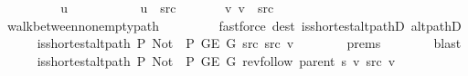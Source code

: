 \begin{isabellebody}
\ \ \isamarkupfalse%
\isanewline
\ \ \ \ \isamarkupfalse%
\ {\isacharparenleft}{\kern0pt}{}\ u{\isacharparenright}{\kern0pt}\isanewline
\ \ \ \ \isamarkupfalse%
\isanewline
\ \ \ \ \ \ {\isachardoublequoteopen}u\ {\isacharequal}{\kern0pt}\ src{\isachardoublequoteclose}\ \isanewline
\ \ \ \ \ \ v{\isacharcolon}{\kern0pt}\ {\isachardoublequoteopen}v\ {\isacharequal}{\kern0pt}\ src{\isachardoublequoteclose}\isanewline
\ \ \ \ \ \ \isamarkupfalse%
\ walk{\isacharunderscore}{\kern0pt}between{\isacharunderscore}{\kern0pt}nonempty{\isacharunderscore}{\kern0pt}path{\isacharparenleft}{\kern0pt}{}{\isacharcomma}{\kern0pt}\ {}{\isacharparenright}{\kern0pt}\isanewline
\ \ \ \ \ \ \isamarkupfalse%
\ {\isacharparenleft}{\kern0pt}fastforce\ dest{\isacharcolon}{\kern0pt}\ is{\isacharunderscore}{\kern0pt}shortest{\isacharunderscore}{\kern0pt}alt{\isacharunderscore}{\kern0pt}pathD{\isacharparenleft}{\kern0pt}{}{\isacharparenright}{\kern0pt}\ alt{\isacharunderscore}{\kern0pt}pathD{\isacharparenleft}{\kern0pt}{}{\isacharparenright}{\kern0pt}{\isacharparenright}{\kern0pt}{\isacharplus}{\kern0pt}\isanewline
\ \ \ \ \isamarkupfalse%
\ {\isachardoublequoteopen}is{\isacharunderscore}{\kern0pt}shortest{\isacharunderscore}{\kern0pt}alt{\isacharunderscore}{\kern0pt}path\ P{\isacharprime}{\kern0pt}{\isacharprime}{\kern0pt}\ {\isacharparenleft}{\kern0pt}Not\ {\isasymcirc}\ P{\isacharprime}{\kern0pt}{\isacharprime}{\kern0pt}{\isacharparenright}{\kern0pt}\ {\isacharparenleft}{\kern0pt}G{\isachardot}{\kern0pt}E\ G{\isacharparenright}{\kern0pt}\ {\isacharbrackleft}{\kern0pt}src{\isacharbrackright}{\kern0pt}\ src\ v{\isachardoublequoteclose}\isanewline
\ \ \ \ \ \ \isamarkupfalse%
\ {\isachardoublequoteopen}{}{\isachardot}{\kern0pt}prems{\isachardoublequoteclose}{\isacharparenleft}{\kern0pt}{}{\isacharparenright}{\kern0pt}\isanewline
\ \ \ \ \ \ \isamarkupfalse%
\ blast\isanewline
\ \ \ \ \isamarkupfalse%
\ {\isachardoublequoteopen}is{\isacharunderscore}{\kern0pt}shortest{\isacharunderscore}{\kern0pt}alt{\isacharunderscore}{\kern0pt}path\ P{\isacharprime}{\kern0pt}{\isacharprime}{\kern0pt}\ {\isacharparenleft}{\kern0pt}Not\ {\isasymcirc}\ P{\isacharprime}{\kern0pt}{\isacharprime}{\kern0pt}{\isacharparenright}{\kern0pt}\ {\isacharparenleft}{\kern0pt}G{\isachardot}{\kern0pt}E\ G{\isacharparenright}{\kern0pt}\ {\isacharparenleft}{\kern0pt}rev{\isacharunderscore}{\kern0pt}follow\ {\isacharparenleft}{\kern0pt}parent\ s{\isacharparenright}{\kern0pt}\ v{\isacharparenright}{\kern0pt}\ src\ v{\isachardoublequoteclose}\isanewline

\end{isabellebody}
